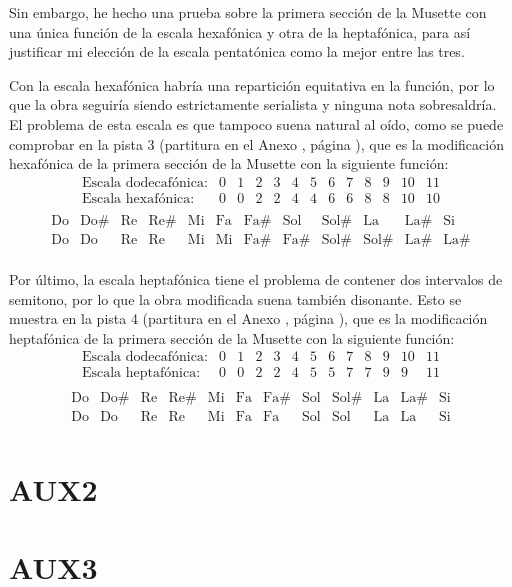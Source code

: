    	Sin embargo, he hecho una prueba sobre la primera sección de la Musette con una única función de la escala hexafónica y otra de la heptafónica, para así justificar mi elección de la escala pentatónica como la mejor entre las tres.
   	
   	Con la escala hexafónica habría una repartición equitativa en la función, por lo que la obra seguiría siendo estrictamente serialista y ninguna nota sobresaldría. El problema de esta escala es que tampoco suena natural al oído, como se puede comprobar en la pista 3 (partitura en el Anexo , página ), que es la modificación hexafónica de la primera sección de la Musette con la siguiente función:
   	$$\left.\begin{matrix}\text{Escala dodecafónica:}&0&1&2&3&4&5&6&7&8&9&10&11\\\text{Escala hexafónica:}&0&0&2&2&4&4&6&6&8&8&10&10\\\end{matrix}\right.$$
   	$$\left.\begin{matrix}\text{Do}&\text{Do\#}&\text{Re}&\text{Re\#}&\text{Mi}&\text{Fa}&\text{Fa\#}&\text{Sol}&\text{Sol\#}&\text{La}&\text{La\#}&\text{Si}\\\text{Do}&\text{Do}&\text{Re}&\text{Re}&\text{Mi}&\text{Mi}&\text{Fa\#}&\text{Fa\#}&\text{Sol\#}&\text{Sol\#}&\text{La\#}&\text{La\#}\\\end{matrix}\right.$$
   	
   	Por último, la escala heptafónica tiene el problema de contener dos intervalos de semitono, por lo que la obra modificada suena también disonante. Esto se muestra en la pista 4 (partitura en el Anexo , página ), que es la modificación heptafónica de la primera sección de la Musette con la siguiente función:
   	$$\left.\begin{matrix}\text{Escala dodecafónica:}&0&1&2&3&4&5&6&7&8&9&10&11\\\text{Escala heptafónica:}&0&0&2&2&4&5&5&7&7&9&9&11\\\end{matrix}\right.$$
   	$$\left.\begin{matrix}\text{Do}&\text{Do\#}&\text{Re}&\text{Re\#}&\text{Mi}&\text{Fa}&\text{Fa\#}&\text{Sol}&\text{Sol\#}&\text{La}&\text{La\#}&\text{Si}\\\text{Do}&\text{Do}&\text{Re}&\text{Re}&\text{Mi}&\text{Fa}&\text{Fa}&\text{Sol}&\text{Sol}&\text{La}&\text{La}&\text{Si}\\\end{matrix}\right.$$	
   
    \section{AUX2}
    \section{AUX3}